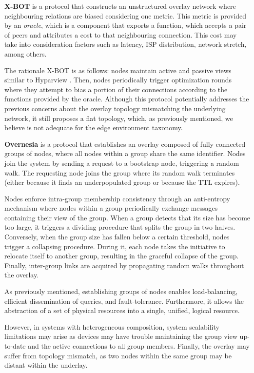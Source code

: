 \textbf{X-BOT} \cite{leitao2012x} is a protocol that constructs an unstructured overlay network where neighbouring relations are biased considering one metric. This metric is provided by an \textit{oracle}, which is a component that exports a function, which accepts a pair of peers and attributes a cost to that neighbouring connection. This cost may take into consideration factors such as latency, ISP distribution, network stretch, among others. 

The rationale X-BOT is as follows: nodes maintain active and passive views similar to Hyparview \cite{Hyparview}. Then, nodes periodically trigger optimization rounds where they attempt to bias a portion of their connections according to the functions provided by the oracle. Although this protocol potentially addresses the previous concerns about the overlay topology mismatching the underlying network, it still proposes a flat topology, which, as previously mentioned, we believe is not adequate for the edge environment taxonomy. 

\textbf{Overnesia} \cite{leitao2014overnesia} is a protocol that establishes an overlay composed of fully connected groups of nodes, where all nodes within a group share the same identifier. Nodes join the system by sending a request to a bootstrap node, triggering a random walk. The requesting node joins the group where its random walk terminates (either because it finds an underpopulated group or because the TTL expires). 

Nodes enforce intra-group membership consistency through an anti-entropy mechanism where nodes within a group periodically exchange messages containing their view of the group. When a group detects that its size has become too large, it triggers a dividing procedure that splits the group in two halves. Conversely, when the group size has fallen below a certain threshold, nodes trigger a collapsing procedure. During it, each node takes the initiative to relocate itself to another group, resulting in the graceful collapse of the group. Finally, inter-group links are acquired by propagating random walks throughout the overlay.

As previously mentioned, establishing groups of nodes enables load-balancing, efficient dissemination of queries, and fault-tolerance. Furthermore, it allows the abstraction of a set of physical resources into a single, unified, logical resource. 

However, in systems with heterogeneous composition, system scalability limitations may arise as devices may have trouble maintaining the group view up-to-date and the active connections to all group members. Finally, the overlay may suffer from topology mismatch, as two nodes within the same group may be distant within the underlay.


